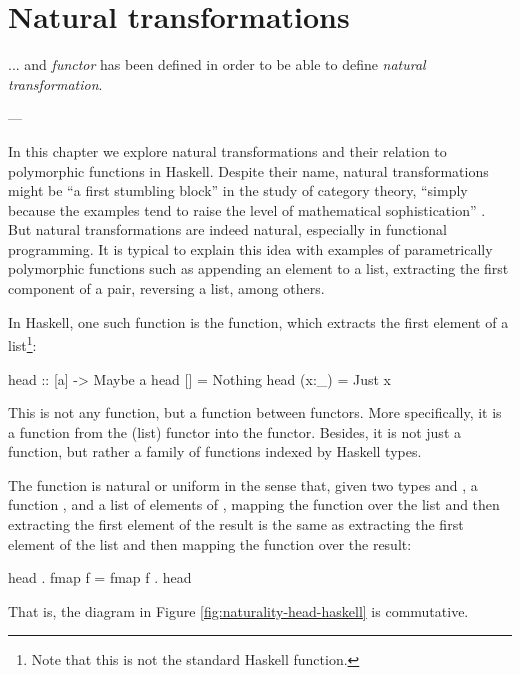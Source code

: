 \chapter{Natural transformations}
\label{chap:naturals}

\epigraph{
  ... and \emph{functor} has been defined in order to be able to
  define \emph{natural transformation}.
}{---\textcite[18]{maclane-1998}}

In this chapter we explore natural transformations and their relation
to polymorphic functions in Haskell. Despite their name, natural
transformations might be ``a first stumbling block'' in the study of
category theory, ``simply because the examples tend to raise the level
of mathematical sophistication'' \parencites[433]{poigne-1992}. But
natural transformations are indeed natural, especially in functional
programming. It is typical to explain this idea with examples of
parametrically polymorphic functions such as appending an element to a
list, extracting the first component of a pair, reversing a list,
among others.

In Haskell, one such function is the  function,
which extracts the first element of a list\footnote{Note that this is
  not the standard Haskell  function.}:
\begin{codehaskell}
head :: [a] -> Maybe a
head []    = Nothing
head (x:_) = Just x
\end{codehaskell}
This is not any function, but a function between functors. More
specifically, it is a function from the \texthaskell{[]} (list)
functor into the  functor. Besides, it is not just
a function, but rather a family of functions indexed by Haskell types.

The  function is natural or uniform in the sense
that, given two types  and , a function
, and a list of elements of ,
mapping the function over the list and then extracting the first
element of the result is the same as extracting the first element of
the list and then mapping the function over the result:
\begin{codehaskell}
head . fmap f = fmap f . head
\end{codehaskell}
That is, the diagram in Figure \ref{fig:naturality-head-haskell} is
commutative.

